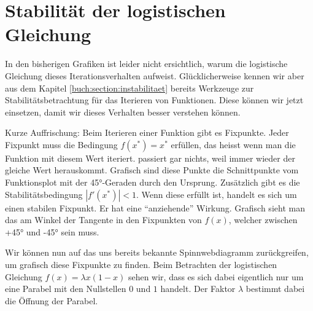 %
%
%
\section{Stabilität der logistischen Gleichung
\label{logistic:section:stabil}}

In den bisherigen Grafiken ist leider nicht ersichtlich, 
warum die logistische Gleichung dieses Iterationsverhalten aufweist. 
Glücklicherweise kennen wir aber aus dem Kapitel 
\ref{buch:section:instabilitaet}
bereits Werkzeuge zur Stabilitätsbetrachtung für
das Iterieren von Funktionen. 
Diese können wir jetzt einsetzen, damit wir dieses
Verhalten besser verstehen können. 

Kurze Auffrischung: Beim Iterieren einer Funktion
gibt es Fixpunkte. 
Jeder Fixpunkt muss die Bedingung
$f(x^*)=x^*$ erfüllen, das heisst wenn man die Funktion
mit diesem Wert iteriert. passiert gar nichts, weil
immer wieder der gleiche Wert herauskommt. 
Grafisch sind diese Punkte die Schnittpunkte
vom Funktionsplot mit der 45°-Geraden durch den Ursprung.  
Zusätzlich gibt es die Stabilitätsbedingung 
$|f'(x^*)| < 1$. 
Wenn diese erfüllt ist, handelt es sich um einen
stabilen Fixpunkt. 
Er hat eine ``anziehende'' Wirkung. 
Grafisch sieht man das am Winkel der Tangente in den
Fixpunkten von $f(x)$, welcher zwischen +45° und -45° sein muss.

Wir können nun auf das uns bereits bekannte Spinnwebdiagramm
zurückgreifen, um grafisch diese Fixpunkte zu finden.
Beim Betrachten der logistischen Gleichung 
$f(x) = \lambda x (1-x)$ sehen wir, 
dass es sich dabei eigentlich nur um eine Parabel mit 
den Nullstellen $0$ und $1$ handelt. 
Der Faktor $\lambda$ bestimmt dabei die Öffnung der Parabel.  

